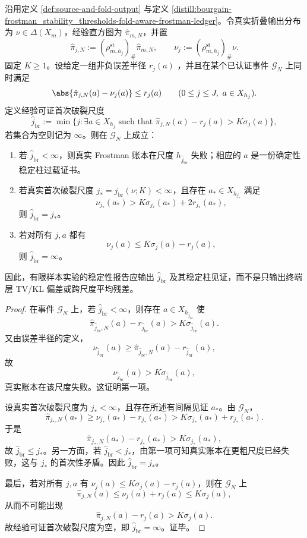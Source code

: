 \begin{proposition}\label{distill:bourgain-frostman_stability_thresholds-finite-sample-first-break-certificate}
沿用定义 \ref{def:source-and-fold-output} 与定义 \ref{distill:bourgain-frostman_stability_thresholds-fold-aware-frostman-ledger}。令真实折叠输出分布为 \(\nu\in\Delta(X_m)\)，经验直方图为 \(\hat\pi_{m,N}\)，并置
\[
\hat\pi_{j,N}:=(\rho^{\mathrm{st}}_{m,h_j})_\#\hat\pi_{m,N},
\qquad
\nu_j:=(\rho^{\mathrm{st}}_{m,h_j})_\#\nu.
\]
固定 \(K\ge1\)。设给定一组非负误差半径 \(r_j(a)\) ，并且在某个已认证事件 \(\mathcal G_N\) 上同时满足
\[
\abs{\hat\pi_{j,N}(a)-\nu_j(a)}
\le r_j(a)
\qquad(0\le j\le J,\ a\in X_{h_j}).
\]
定义经验可证首次破裂尺度
\[
\widehat j_{\mathrm{br}}
:=
\min\{j:\exists a\in X_{h_j}\text{ such that }
\hat\pi_{j,N}(a)-r_j(a)>K\sigma_j(a)\},
\]
若集合为空则记为 \(\infty\)。则在 \(\mathcal G_N\) 上成立：
\begin{enumerate}
\item 若 \(\widehat j_{\mathrm{br}}<\infty\)，则真实 Frostman 账本在尺度 \(h_{\widehat j_{\mathrm{br}}}\) 失败；相应的 \(a\) 是一份确定性稳定柱过载证书。
\item 若真实首次破裂尺度 \(j_\ast=j_{\mathrm{br}}(\nu;K)<\infty\)，且存在 \(a_\ast\in X_{h_{j_\ast}}\) 满足
\[
\nu_{j_\ast}(a_\ast)>K\sigma_{j_\ast}(a_\ast)+2r_{j_\ast}(a_\ast),
\]
则 \(\widehat j_{\mathrm{br}}=j_\ast\)。
\item 若对所有 \(j,a\) 都有
\[
\nu_j(a)\le K\sigma_j(a)-r_j(a),
\]
则 \(\widehat j_{\mathrm{br}}=\infty\)。
\end{enumerate}
因此，有限样本实验的稳定性报告应输出 \(\widehat j_{\mathrm{br}}\) 及其稳定柱见证，而不是只输出终端层 TV/KL 偏差或跨尺度平均残差。
\end{proposition}
\begin{proof}
在事件 \(\mathcal G_N\) 上，若 \(\widehat j_{\mathrm{br}}<\infty\)，则存在 \(a\in X_{h_{\widehat j_{\mathrm{br}}}}\) 使
\[
\hat\pi_{\widehat j_{\mathrm{br}},N}(a)-r_{\widehat j_{\mathrm{br}}}(a)>K\sigma_{\widehat j_{\mathrm{br}}}(a).
\]
又由误差半径的定义，
\[
\nu_{\widehat j_{\mathrm{br}}}(a)\ge
\hat\pi_{\widehat j_{\mathrm{br}},N}(a)-r_{\widehat j_{\mathrm{br}}}(a),
\]
故
\[
\nu_{\widehat j_{\mathrm{br}}}(a)>K\sigma_{\widehat j_{\mathrm{br}}}(a),
\]
真实账本在该尺度失败。这证明第一项。

设真实首次破裂尺度为 \(j_\ast<\infty\)，且存在所述有间隔见证 \(a_\ast\)。由 \(\mathcal G_N\)，
\[
\hat\pi_{j_\ast,N}(a_\ast)\ge
\nu_{j_\ast}(a_\ast)-r_{j_\ast}(a_\ast)
>K\sigma_{j_\ast}(a_\ast)+r_{j_\ast}(a_\ast).
\]
于是
\[
\hat\pi_{j_\ast,N}(a_\ast)-r_{j_\ast}(a_\ast)>K\sigma_{j_\ast}(a_\ast),
\]
故 \(\widehat j_{\mathrm{br}}\le j_\ast\)。另一方面，若 \(\widehat j_{\mathrm{br}}<j_\ast\)，由第一项可知真实账本在更粗尺度已经失败，这与 \(j_\ast\) 的首次性矛盾。因此 \(\widehat j_{\mathrm{br}}=j_\ast\)。

最后，若对所有 \(j,a\) 有 \(\nu_j(a)\le K\sigma_j(a)-r_j(a)\)，则在 \(\mathcal G_N\) 上
\[
\hat\pi_{j,N}(a)\le \nu_j(a)+r_j(a)\le K\sigma_j(a),
\]
从而不可能出现
\[
\hat\pi_{j,N}(a)-r_j(a)>K\sigma_j(a).
\]
故经验可证首次破裂尺度为空，即 \(\widehat j_{\mathrm{br}}=\infty\)。证毕。
\end{proof}


